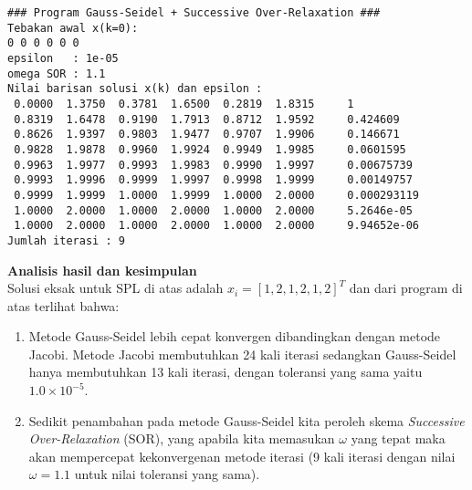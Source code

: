 \documentclass[paper=a4, fontsize=11pt]{scrartcl}
\numberwithin{equation}{section} %
\numberwithin{figure}{section} %
\numberwithin{table}{section} %
\begin{document}
\begin{small}
\begin{verbatim}
### Program Gauss-Seidel + Successive Over-Relaxation ###
Tebakan awal x(k=0): 
0 0 0 0 0 0 
epsilon   : 1e-05
omega SOR : 1.1
Nilai barisan solusi x(k) dan epsilon : 
 0.0000  1.3750  0.3781  1.6500  0.2819  1.8315 	1
 0.8319  1.6478  0.9190  1.7913  0.8712  1.9592 	0.424609
 0.8626  1.9397  0.9803  1.9477  0.9707  1.9906 	0.146671
 0.9828  1.9878  0.9960  1.9924  0.9949  1.9985 	0.0601595
 0.9963  1.9977  0.9993  1.9983  0.9990  1.9997 	0.00675739
 0.9993  1.9996  0.9999  1.9997  0.9998  1.9999 	0.00149757
 0.9999  1.9999  1.0000  1.9999  1.0000  2.0000 	0.000293119
 1.0000  2.0000  1.0000  2.0000  1.0000  2.0000 	5.2646e-05
 1.0000  2.0000  1.0000  2.0000  1.0000  2.0000 	9.94652e-06
Jumlah iterasi : 9
\end{verbatim}
\end{small}

\textbf{Analisis hasil dan kesimpulan}\\
Solusi eksak untuk SPL di atas adalah $x_{i} = [1, 2, 1, 2, 1, 2]^{T}$ dan dari program di atas terlihat bahwa:
\begin{enumerate}
\item Metode Gauss-Seidel lebih cepat konvergen dibandingkan dengan metode Jacobi. Metode Jacobi membutuhkan 24 kali iterasi sedangkan Gauss-Seidel hanya membutuhkan 13 kali iterasi, dengan toleransi yang sama yaitu $1.0\times 10^{-5}$.
\item Sedikit penambahan pada metode Gauss-Seidel kita peroleh skema \textit{Successive Over-Relaxation} (SOR), yang apabila kita memasukan $\omega $ yang tepat maka akan mempercepat kekonvergenan metode iterasi (9 kali iterasi dengan nilai $\omega = 1.1$ untuk nilai toleransi yang sama).
\end{enumerate}
\end{document}
